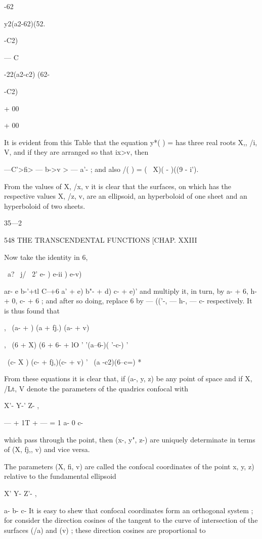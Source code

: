 {{-62 


y2(a2-62)(52. 


-C2) 


— C  


-22(a2-c2) (62- 


-C2) 


+ 00 


+ 00 





It is evident from this Table that the equation y*( ) = has three real 
roots X,, /i, V, and if they are arranged so that   ix>v, then 

 —C'>fi> — b->v > — a'- ; 
and also /( ) = ( \ X)( -  )((9 - i'). 

From the values of X, /x, v it is clear that the surfaces, on which has 
the respective values X, /z, v, are an ellipsoid, an hyperboloid of one sheet and 
an hyperboloid of two sheets. 

35—2 



548 THE TRANSCENDENTAL FUNCTIONS [CHAP. XXIII 

Now take the identity in 6, 

\  a? \  j/  \  2'     e- )  e-ii ) e-v) 

ar- e b-'+tl C--+6  a' + e) b"- + d) c- + e)' 
and multiply it, in turn, by a- + 6, h- + 0, c- + 6 ; and after so doing, replace 
6 by — (('-, — h-, — c- respectively. It is thus found that 

, \  (a- +  )  (a  + fj.) (a- + v) 

,   \  (6  + X) (6 + 6- + lO 
 ' '(a--6-)( '-c-) ' 

  \  (c-  X ) (c- + fj,)(c- + v) 
 '~ (a -c2)(6--c=) * 

From these equations it is clear that, if (a-, y, z) be any point of space and 
if X, /Lt, V denote the parameters of the quadrics confocal with 

X'- Y-' Z- , 

— + 1T + — = 1 
a- 0  c- 

which pass through the point, then (x-, y", z-) are uniquely determinate in 
terms of (X, fj,, v) and vice versa. 

The parameters (X, fi, v) are called the confocal coordinates of the point 
 x, y, z) relative to the fundamental ellipsoid 

X' Y- Z'- , 

a- b- c- 
It is easy to shew that confocal coordinates form an orthogonal system ; 
for consider the direction cosines of the tangent to the curve of intersection 
of the surfaces (/a) and (v) ; these direction cosines are proportional to 

}}
